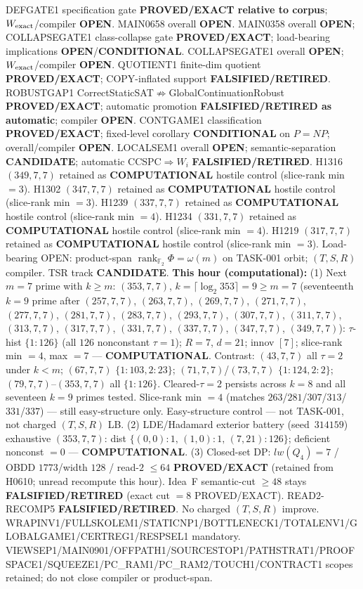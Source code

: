 \documentclass[11pt]{article}
\begin{document}
DEFGATE1 specification gate \textbf{PROVED/EXACT relative to corpus};
$W_{\rm exact}$/compiler \textbf{OPEN}.
MAIN0658 overall \textbf{OPEN}.
MAIN0358 overall \textbf{OPEN}; COLLAPSEGATE1 class-collapse gate \textbf{PROVED/EXACT};
load-bearing implications \textbf{OPEN}/\textbf{CONDITIONAL}.
COLLAPSEGATE1 overall \textbf{OPEN}; $W_{\rm exact}$/compiler \textbf{OPEN}.
QUOTIENT1 finite-dim quotient \textbf{PROVED/EXACT}; COPY-inflated support \textbf{FALSIFIED/RETIRED}.
ROBUSTGAP1 CorrectStaticSAT$\not\Rightarrow$GlobalContinuationRobust \textbf{PROVED/EXACT};
automatic promotion \textbf{FALSIFIED/RETIRED as automatic}; compiler \textbf{OPEN}.
CONTGAME1 classification \textbf{PROVED/EXACT}; fixed-level corollary \textbf{CONDITIONAL} on $P=NP$;
overall/compiler \textbf{OPEN}.
LOCALSEM1 overall \textbf{OPEN}; semantic-separation \textbf{CANDIDATE}; automatic CCSPC$\Rightarrow W_i$
\textbf{FALSIFIED/RETIRED}.
H1316 $(349,7,7)$ retained as \textbf{COMPUTATIONAL} hostile control (slice-rank min $=3$).
H1302 $(347,7,7)$ retained as \textbf{COMPUTATIONAL} hostile control (slice-rank min $=3$).
H1239 $(337,7,7)$ retained as \textbf{COMPUTATIONAL} hostile control (slice-rank min $=4$).
H1234 $(331,7,7)$ retained as \textbf{COMPUTATIONAL} hostile control (slice-rank min $=4$).
H1219 $(317,7,7)$ retained as \textbf{COMPUTATIONAL} hostile control (slice-rank min $=3$).
Load-bearing OPEN: product-span $\operatorname{rank}_{\mathbb F_2}\Phi=\omega(m)$ on TASK-001 orbit;
$(T,S,R)$ compiler. TSR track \textbf{CANDIDATE}.
\textbf{This hour (computational):}
(1) Next $m{=}7$ prime with $k{\ge}m$: $(353,7,7)$, $k{=}\lceil\log_2 353\rceil=9{\ge}m{=}7$
(seventeenth $k{=}9$ prime after $(257,7,7)$, $(263,7,7)$, $(269,7,7)$, $(271,7,7)$, $(277,7,7)$, $(281,7,7)$, $(283,7,7)$, $(293,7,7)$, $(307,7,7)$, $(311,7,7)$, $(313,7,7)$, $(317,7,7)$, $(331,7,7)$, $(337,7,7)$, $(347,7,7)$, $(349,7,7)$):
$\tau$-hist $\{1{:}126\}$ (all $126$ nonconstant $\tau{=}1$); $R{=}7$, $d{=}21$; innov $[7]$;
slice-rank min $=4$, max $=7$ --- \textbf{COMPUTATIONAL}.
Contrast: $(43,7,7)$ all $\tau{=}2$ under $k{<}m$; $(67,7,7)$ $\{1{:}103,2{:}23\}$;
$(71,7,7)$/$(73,7,7)$ $\{1{:}124,2{:}2\}$; $(79,7,7)$--$(353,7,7)$ all $\{1{:}126\}$.
Cleared-$\tau{=}2$ persists across $k{=}8$ and all seventeen $k{=}9$ primes tested.
Slice-rank min $=4$ (matches $263$/$281$/$307$/$313$/$331$/$337$) --- still easy-structure only.
Easy-structure control --- not TASK-001, not charged $(T,S,R)$ LB.
(2) LDE/Hadamard exterior battery (seed~$314159$) exhaustive $(353,7,7)$:
dist $\{(0,0){:}1,\,(1,0){:}1,\,(7,21){:}126\}$; deficient nonconst $=0$ --- \textbf{COMPUTATIONAL}.
(3) Closed-set DP: $lw(Q_4)=7$ / OBDD $1773$/width $128$ / read-$2$ $\le64$
\textbf{PROVED/EXACT} (retained from H0610; unread recompute this hour).
Idea~F semantic-cut $\ge48$ stays \textbf{FALSIFIED/RETIRED} (exact cut $=8$ PROVED/EXACT).
READ2-RECOMP5 \textbf{FALSIFIED/RETIRED}. No charged $(T,S,R)$ improve.
WRAPINV1/FULLSKOLEM1/STATICNP1/BOTTLENECK1/TOTALENV1/GLOBALGAME1/CERTREG1/RESPSEL1 mandatory.
VIEWSEP1/MAIN0901/OFFPATH1/SOURCESTOP1/PATHSTRAT1/PROOFSPACE1/SQUEEZE1/PC\_RAM1/PC\_RAM2/TOUCH1/CONTRACT1 scopes retained; do not close compiler or product-span.
\end{document}
